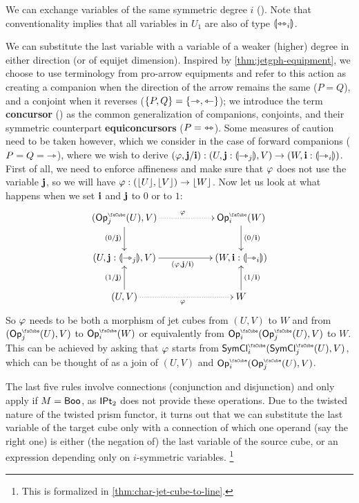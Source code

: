 \documentclass[a4paper]{memoir}
\begin{document}
We can exchange variables of the same symmetric degree $i$ ().
Note that conventionality implies that all variables in $U_1$ are also of type ${\llparenthesis \leftrightarrowtriangle_i \rrparenthesis}$.

We can substitute the last variable with a variable of a weaker (higher) degree in either direction (or of equijet dimension).
Inspired by \cref{thm:jetgph-equipment}, we choose to use terminology from pro-arrow equipments and refer to this action as creating a companion when the direction of the arrow remains the same ($P = Q$), and a conjoint when it reverses ($\mathopen{}\left\{ P, Q \right\}\mathclose{} = \mathopen{}\left\{ \rightarrowtriangle, \leftarrowtriangle \right\}\mathclose{}$); we introduce the term \textbf{concursor} () as the common generalization of companions, conjoints, and their symmetric counterpart \textbf{equiconcursors} ($P = {\leftrightarrowtriangle}$).
Some measures of caution need to be taken however, which we consider in the case of forward companions ($P = Q = {\rightarrowtriangle}$), where we wish to derive $(\varphi, \mathbf{j} / \mathbf{i}) : (U, \mathbf{j} : {\llparenthesis \rightarrowtriangle_j \rrparenthesis}, V) \to (W, \mathbf{i} : {\llparenthesis \rightarrowtriangle_i \rrparenthesis})$.
First of all, we need to enforce affineness and make sure that $\varphi$ does not use the variable $\mathbf{j}$, so we will have $\varphi : (\mathopen{}\left\lfloor U \right\rfloor\mathclose{}, \mathopen{}\left\lfloor V \right\rfloor\mathclose{}) \to \mathopen{}\left\lfloor W \right\rfloor\mathclose{}$.
Now let us look at what happens when we set $\mathbf{i}$ and $\mathbf{j}$ to $0$ or to $1$:
\[
	\xymatrix{
		(\Opcube_j(U), V)
			\ar[d]_{(0/\dm j)}
			\ar@{.>}[rr]^\vfi
		&&
		\Opcube_i(W)
			\ar[d]^{(0/\dm i)}
		\\
		(U, \dm j : \rival{\jet_j}, V)
			\ar[rr]_{(\vfi, \dm j / \dm i)}
		&& (W, \dm i : \rival{\jet_i})
		\\
		(U, V)
			\ar[u]^{(1/\dm j)}
			\ar@{.>}[rr]_\vfi
		&&
		W
			\ar[u]_{(1/\dm i)}
	}
\]
So $\varphi$ needs to be both a morphism of jet cubes from $(U, V)$ to $W$ and from $(\Opcube_j(U), V)$ to $\Opcube_i(W)$ or equivalently from $\Opcube_i(\Opcube_j(U), V)$ to $W$. This can be achieved by asking that $\varphi$ starts from \allowbreak $\UFsymcube_i(\UFsymcube_j(U), V)$, which can be thought of as a join of $(U, V)$ and $\Opcube_i(\Opcube_j(U), V)$.

The last five rules involve connections (conjunction and disjunction) and only apply if $M = \mathsf{Boo}$, as ${\mathsf{IPt}_2}$ does not provide these operations.
Due to the twisted nature of the twisted prism functor, it turns out that we can substitute the last variable of the target cube only with a connection of which one operand (say the right one) is either (the negation of) the last variable of the source cube, or an expression depending only on $i$-symmetric variables.%
\footnote{This is formalized in \cref{thm:char-jet-cube-to-line}.}
\end{document}
